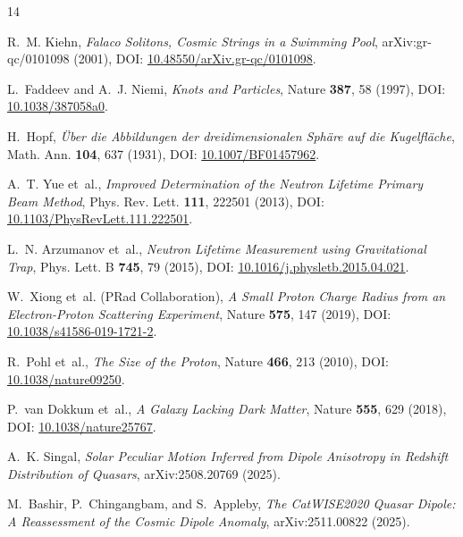 \documentclass[11pt,a4paper]{article}
\begin{document}
	\begin{thebibliography}{14}
		
		R.~M. Kiehn, \emph{Falaco Solitons, Cosmic Strings in a Swimming Pool}, arXiv:gr-qc/0101098 (2001), DOI: \href{https://doi.org/10.48550/arXiv.gr-qc/0101098}{10.48550/arXiv.gr-qc/0101098}.
		
		L.~Faddeev and A.~J. Niemi, \emph{Knots and Particles}, Nature \textbf{387}, 58 (1997), DOI: \href{https://doi.org/10.1038/387058a0}{10.1038/387058a0}.
		
		H.~Hopf, \emph{\"Uber die Abbildungen der dreidimensionalen Sph\"are auf die Kugelfl\"ache}, Math. Ann. \textbf{104}, 637 (1931), DOI: \href{https://doi.org/10.1007/BF01457962}{10.1007/BF01457962}.
		
		A.~T. Yue et~al., \emph{Improved Determination of the Neutron Lifetime Primary Beam Method}, Phys. Rev. Lett. \textbf{111}, 222501 (2013), DOI: \href{https://doi.org/10.1103/PhysRevLett.111.222501}{10.1103/PhysRevLett.111.222501}.
		
		L.~N. Arzumanov et~al., \emph{Neutron Lifetime Measurement using Gravitational Trap}, Phys. Lett. B \textbf{745}, 79 (2015), DOI: \href{https://doi.org/10.1016/j.physletb.2015.04.021}{10.1016/j.physletb.2015.04.021}.
		
		W.~Xiong et~al. (PRad Collaboration), \emph{A Small Proton Charge Radius from an Electron-Proton Scattering Experiment}, Nature \textbf{575}, 147 (2019), DOI: \href{https://doi.org/10.1038/s41586-019-1721-2}{10.1038/s41586-019-1721-2}.
		
		R.~Pohl et~al., \emph{The Size of the Proton}, Nature \textbf{466}, 213 (2010), DOI: \href{https://doi.org/10.1038/nature09250}{10.1038/nature09250}.
		
		P.~van Dokkum et~al., \emph{A Galaxy Lacking Dark Matter}, Nature \textbf{555}, 629 (2018), DOI: \href{https://doi.org/10.1038/nature25767}{10.1038/nature25767}.
		
		A.~K. Singal, \emph{Solar Peculiar Motion Inferred from Dipole Anisotropy in Redshift Distribution of Quasars}, arXiv:2508.20769 (2025).
		
		M.~Bashir, P.~Chingangbam, and S.~Appleby, \emph{The CatWISE2020 Quasar Dipole: A Reassessment of the Cosmic Dipole Anomaly}, arXiv:2511.00822 (2025).
		

\end{thebibliography}
\end{document}
